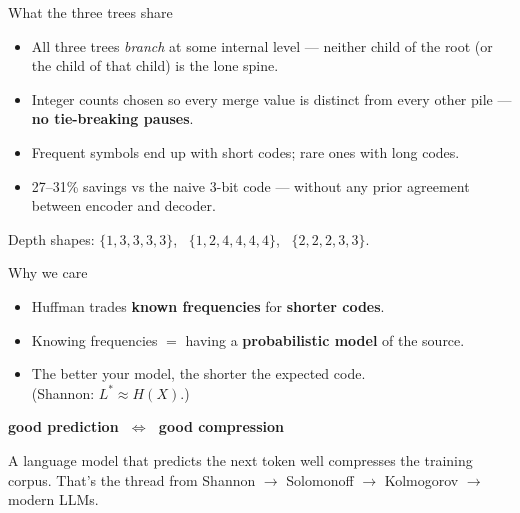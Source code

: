 \documentclass[aspectratio=169, 12pt, xcolor={dvipsnames,table}]{beamer}
\begin{document}
\begin{frame}{What the three trees share}
\large
\begin{itemize}
  \item All three trees \emph{branch} at some internal level --- neither child of the root (or the child of that child) is the lone spine.
  \item Integer counts chosen so every merge value is distinct from every other pile --- \textbf{no tie-breaking pauses}.
  \item Frequent symbols end up with short codes; rare ones with long codes.
  \item 27--31\% savings vs the naive 3-bit code --- without any prior agreement between encoder and decoder.
\end{itemize}
\vfill
\begin{center}
\small\textcolor{hint}{Depth shapes: $\{1,3,3,3,3\}$, \ $\{1,2,4,4,4,4\}$, \ $\{2,2,2,3,3\}$.}
\end{center}
\end{frame}

\begin{frame}{Why we care}
\vfill
\begin{itemize}
  \item Huffman trades \textbf{known frequencies} for \textbf{shorter codes}.
  \item Knowing frequencies $=$ having a \textbf{probabilistic model} of the source.
  \item The better your model, the shorter the expected code. \\(Shannon: $L^* \approx H(X)$.)
\end{itemize}
\vfill
\begin{center}
\Large \textbf{good prediction $\;\Longleftrightarrow\;$ good compression}
\end{center}
\vfill
\begin{center}
\small\textcolor{hint}{A language model that predicts the next token well compresses the training corpus. That's the thread from Shannon $\to$ Solomonoff $\to$ Kolmogorov $\to$ modern LLMs.}
\end{center}
\end{frame}
\end{document}
